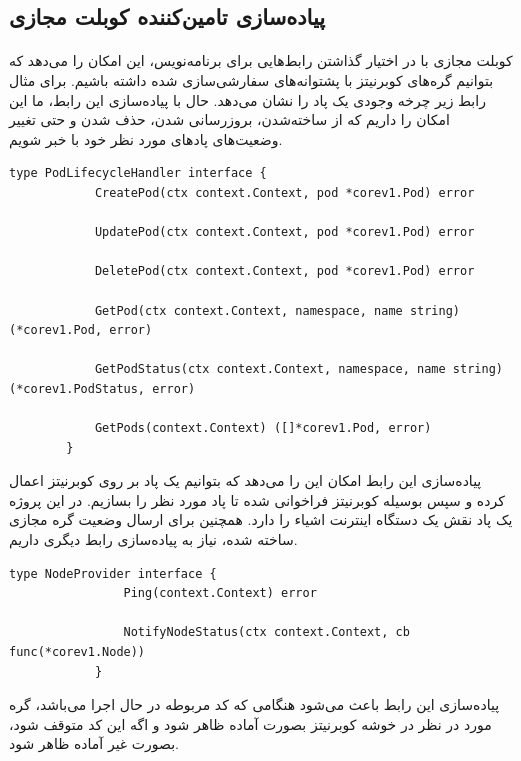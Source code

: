 \subsection{پیاده‌سازی تامین‌کننده کوبلت مجازی}
\label{subsec:provider}
\paragraph{}
{
    کوبلت مجازی با در اختیار گذاشتن رابط‌هایی برای برنامه‌نویس، این امکان را می‌دهد که بتوانیم گره‌های کوبرنیتز با پشتوانه‌های
    سفارشی‌سازی شده داشته باشیم. برای مثال رابط زیر چرخه وجودی یک پاد را نشان می‌دهد. حال با پیاده‌سازی این رابط، ما این امکان
    را داریم که از ساخته‌شدن، بروزرسانی شدن، حذف شدن و حتی تغییر وضعیت‌های پاد‌های مورد نظر خود با خبر شویم.
    \newpage
    \begin{latin}
    \begin{lstlisting}[caption=پاد وجودی چرخه کنترل‌کننده رابط]
        type PodLifecycleHandler interface {
            CreatePod(ctx context.Context, pod *corev1.Pod) error
        
            UpdatePod(ctx context.Context, pod *corev1.Pod) error
        
            DeletePod(ctx context.Context, pod *corev1.Pod) error
        
            GetPod(ctx context.Context, namespace, name string) (*corev1.Pod, error)
        
            GetPodStatus(ctx context.Context, namespace, name string) (*corev1.PodStatus, error)
        
            GetPods(context.Context) ([]*corev1.Pod, error)
        }        
    \end{lstlisting}
    \end{latin}

    پیاده‌سازی این رابط امکان این را می‌دهد که بتوانیم یک پاد بر روی کوبرنیتز اعمال کرده و سپس بوسیله کوبرنیتز فراخوانی شده تا پاد مورد نظر را بسازیم. در  این پروژه یک پاد نقش یک دستگاه اینترنت اشیاء را دارد.
    همچنین برای ارسال وضعیت گره مجازی ساخته شده، نیاز به پیاده‌سازی رابط دیگری داریم.

    \begin{latin}
        \begin{lstlisting}[caption={گره وضعیت کنترل‌کننده رابط}]
            type NodeProvider interface {
                Ping(context.Context) error

                NotifyNodeStatus(ctx context.Context, cb func(*corev1.Node))
            }

        \end{lstlisting}
    \end{latin}

    پیاده‌سازی این رابط باعث می‌شود هنگامی که کد مربوطه در حال اجرا می‌باشد، گره مورد در نظر در خوشه کوبرنیتز بصورت آماده ظاهر شود و اگه این کد متوقف شود، بصورت غیر آماده ظاهر شود.
}


